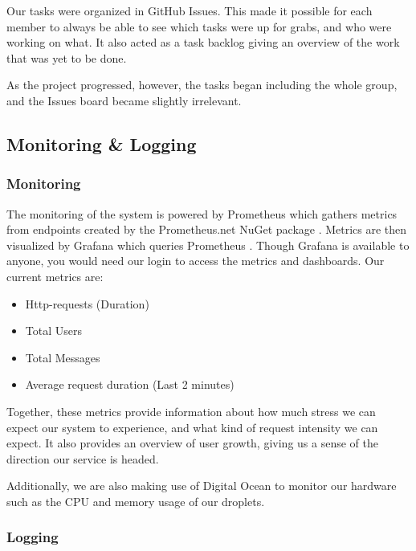 Our tasks were organized in GitHub Issues. This made it possible for each member to always be able to see which tasks were up for grabs, and who were working on what. It also acted as a task backlog giving an overview of the work that was yet to be done.

As the project progressed, however, the tasks began including the whole group, and the Issues board became slightly irrelevant.

\subsection{Monitoring \& Logging}

\subsubsection{Monitoring} \label{Monitoring}
The monitoring of the system is powered by Prometheus which gathers metrics from endpoints created by the Prometheus.net NuGet package \autocite{prometheus}. Metrics are then visualized by Grafana which queries Prometheus \autocite{grafana}. Though Grafana is available to anyone, you would need our login to access the metrics and dashboards. Our current metrics are:

\begin{itemize}
    \item Http-requests (Duration)
    \item Total Users
    \item Total Messages
    \item Average request duration (Last 2 minutes)
\end{itemize}

\noindent Together, these metrics provide information about how much stress we can expect our system to experience, and what kind of request intensity we can expect. It also provides an overview of user growth, giving us a sense of the direction our service is headed. 

Additionally, we are also making use of Digital Ocean to monitor our hardware such as the CPU and memory usage of our droplets.

\subsubsection{Logging} \label{Logging}

